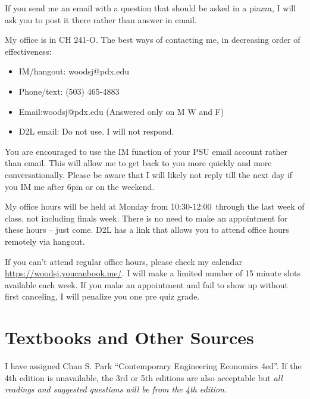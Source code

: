 \documentclass[letterpaper,10pt]{article}
\newcommand{\Office}{at Monday from 10:30-12:00}
\begin{document}
If you send me an email with a question that should be asked in a piazza, I
will ask you to post it there rather than answer in email.


 
My office is in CH 241-O.  The best ways of contacting me, in
decreasing order of effectiveness:
\begin{itemize}
\item IM/hangout: woodsj@pdx.edu
\item Phone/text: (503) 465-4883
\item Email:woodsj@pdx.edu (Answered only on M W and F)
\item D2L email: Do not use.  I will not respond.
\end{itemize}

You are encouraged to use the IM function of your PSU email account rather than email. This will allow me to get back to you more quickly and more conversationally. Please be aware that I will likely not reply till the next day if you IM me after 6pm or on the weekend.  

My office hours will be held \Office ~through the last week of class, not including finals week. There is no need to make an appointment for these hours -- just come.  D2L has a link that allows you to attend office hours remotely via hangout.



If you can’t attend regular office hours, please check my calendar \url{https://woodsj.youcanbook.me/}. I will make a limited number of 15 minute slots available each week. If you make an appointment and fail to show up without first canceling, I will penalize you one pre quiz grade.  



\section{Textbooks and Other Sources}
I have assigned Chan S. Park ``Contemporary Engineering Economics
4ed''.  If the 4th edition is unavailable, the 3rd or 5th editions are also
acceptable but \emph{all readings and suggested questions will be from
  the 4th edition.} 
  
\end{document}
